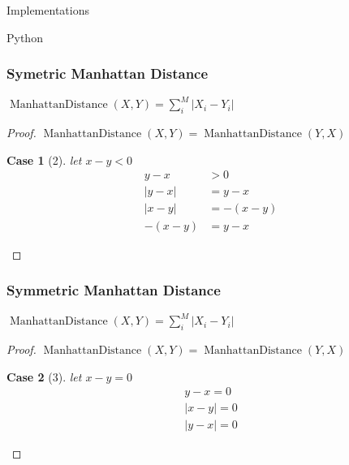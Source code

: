 \documentclass{beamer}
\theoremstyle{case}
\newtheorem{case}{Case}
\DeclareMathOperator{\md}{Manhattan Distance}
\begin{document}
\begin{section}{Implementations}
\begin{subsection}{Python}
\begin{frame}
    \frametitle{Symetric Manhattan Distance}
    \begin{center}
    $\md(X, Y) = \sum_i^M | X_i - Y_i |$
    \end{center}
    \begin{proof}
        \renewcommand{\qedsymbol}{}
        $\md(X, Y) = \md(Y,X)$
        \begin{case}[2]
            let $x - y < 0$
            \begin{align*}
                y - x &> 0 \\
                |y - x| &= y - x \\
                |x - y| &= -(x - y) \\
                -(x - y) &= y - x
            \end{align*}
        \end{case}
    \end{proof}
\end{frame}

\begin{frame}
    \frametitle{Symmetric Manhattan Distance}
    \begin{center}
    $\md(X, Y) = \sum_i^M | X_i - Y_i |$
    \end{center}
    \begin{proof}
        $\md(X, Y) = \md(Y,X)$
        \begin{case}[3]
            let $x - y = 0$
            \begin{align*}
                y - x = 0 \\
                |x - y| = 0 \\
                |y - x| = 0
            \end{align*}
        \end{case}
    \end{proof}
\end{frame}


\end{subsection}
\end{section}
\end{document}

